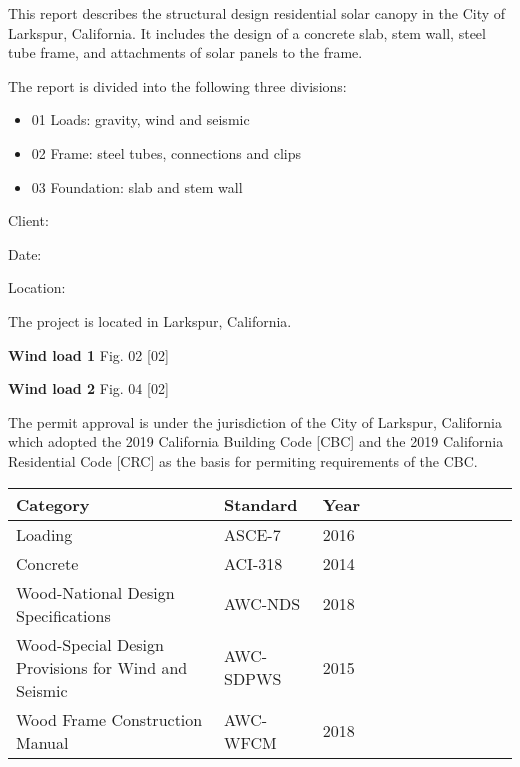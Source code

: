 \documentclass[12pt,notitle,letterpaper]{report}
\begin{document}
\setcounter{page}{7}

\makeatletter\renewcommand{}\makeatother\tableofcontents\listoftables\listoffigures

This report describes the structural design residential solar canopy in
the City of Larkspur, California. It includes the design of a concrete
slab, stem wall, steel tube frame, and attachments of solar panels to the
frame.

The report is divided into the following three divisions:

\begin{itemize}
\item 01 Loads: gravity, wind and seismic

\item 02 Frame: steel tubes, connections and clips

\item 03 Foundation: slab and stem wall
\end{itemize}

Client:

Date:

Location:

The project is located in Larkspur, California.

\noindent{}

\textbf{Wind load 1} \hfill  Fig. 02 {[}02{]}

\noindent{}

\textbf{Wind load 2} \hfill  Fig. 04 {[}02{]}

The permit approval is under the jurisdiction of the City of Larkspur,
California which adopted the 2019 California Building Code {[}CBC{]} and the
2019 California Residential Code {[}CRC{]} as the basis for permiting
requirements of the CBC.

 \begin{tabulary}{1.0\textwidth}{leftleftleft}
\hline
 Category                                            & Standard   &   Year \\
\hline
 Loading                                             & ASCE-7     &   2016 \\
 Concrete                                            & ACI-318    &   2014 \\
 Wood-National Design Specifications                 & AWC-NDS    &   2018 \\
 Wood-Special Design Provisions for Wind and Seismic & AWC-SDPWS  &   2015 \\
 Wood Frame Construction Manual                      & AWC-WFCM   &   2018 \\
\hline
\end{tabulary}
\vspace{.15in}
\end{document}
